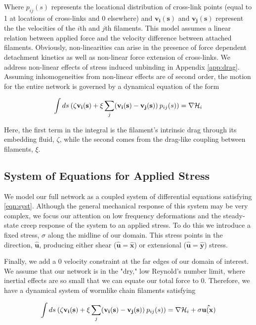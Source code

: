 \documentclass[pre,preprint]{revtex4-1}
\begin{document}
Where $p_{ij}(s)$ represents the locational distribution of cross-link points (equal to 1 at locations of cross-links and 0 elsewhere) and $\mathbf{v_i(s)}$ and $\mathbf{v_j(s)}$ represent the the velocities of the $i$th and $j$th filaments.  This model assumes a linear relation between applied force and the velocity difference between attached filaments.  Obviously, non-linearities can arise in the presence of force dependent detachment kinetics as well as non-linear force extension of cross-links. We address non-linear effects of stress induced unbinding in Appendix \ref{app:drag}.  Assuming inhomogeneities from non-linear effects are of second order, the motion for the entire network is governed by a dynamical equation of the form

\begin{equation}
\label{eqn:syst}
\int ds \: (\mathbf{\zeta v_i(s)} + \xi \sum _j(\mathbf{v_i(s)}-\mathbf{v_j(s)}) \: p_{ij}(s))= \nabla {\cal H}_i
\end{equation}

Here, the first term in the integral is the filament's intrinsic drag through its embedding fluid, $\zeta$, while the second comes from the drag-like coupling between filaments, $\xi$.  


\subsection{System of Equations for Applied Stress}
We model our full network as a coupled system of differential equations satisfying \ref{eqn:syst}.  Although the general mechanical response of this system may be very complex, we focus our attention on low frequency deformations and the steady-state creep response of the system to an applied stress.  To do this we introduce a fixed stress, $\sigma$ along the midline of our domain.  This stress points in the direction, $\mathbf{\hat{u}}$, producing either shear ($\mathbf{\hat{u}}=\mathbf{\hat{x}}$) or extensional ($\mathbf{\hat{u}}=\mathbf{\hat{y}}$) stress.

Finally, we add a 0 velocity constraint at the far edges of our domain of interest.  We assume that our network is in the "dry," low Reynold's number limit, where inertial effects are so small that we can equate our total force to 0.  Therefore, we have a dynamical system of wormlike chain filaments satisfying 

\begin{equation}
\int ds \: (\zeta\mathbf{v_i(s)} + \xi \sum _j(\mathbf{v_i(s)}-\mathbf{v_j(s)}) \: p_{ij}(s)) = \nabla {\cal H}_i + \sigma\mathbf{\hat{u(x)}}
\end{equation}
\end{document}
